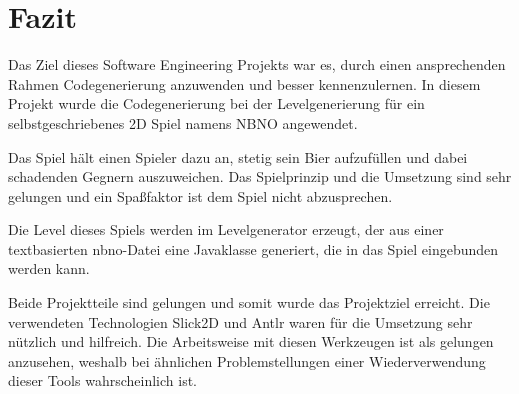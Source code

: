 \section{Fazit}

Das Ziel dieses Software Engineering Projekts war es, durch einen ansprechenden Rahmen Codegenerierung anzuwenden und besser kennenzulernen.
In diesem Projekt wurde die Codegenerierung bei der Levelgenerierung für ein selbstgeschriebenes 2D Spiel namens NBNO angewendet.

Das Spiel hält einen Spieler dazu an, stetig sein Bier aufzufüllen und dabei schadenden Gegnern auszuweichen.
Das Spielprinzip und die Umsetzung sind sehr gelungen und ein Spaßfaktor ist dem Spiel nicht abzusprechen.

Die Level dieses Spiels werden im Levelgenerator erzeugt, der aus einer textbasierten nbno-Datei eine Javaklasse generiert, die in das Spiel eingebunden werden kann.

Beide Projektteile sind gelungen und somit wurde das Projektziel erreicht.
Die verwendeten Technologien Slick2D und Antlr waren für die Umsetzung sehr nützlich und hilfreich.
Die Arbeitsweise mit diesen Werkzeugen ist als gelungen anzusehen, weshalb bei ähnlichen Problemstellungen einer Wiederverwendung dieser Tools wahrscheinlich ist.